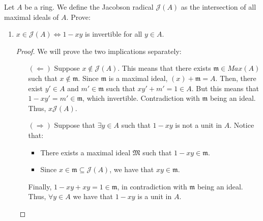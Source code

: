 
\begin{problem}
    Let $A$ be a ring.
    We define the Jacobson radical $\mathcal{J}(A)$ as the intersection of all maximal ideals of $A$.
    Prove:
    \begin{enumerate}[label=(\theproblem.\arabic*),ref=\theproblem.\arabic*]

        \item \label{itm:jacobson_element_to_invertible}
        $x \in \mathcal{J}(A) \Leftrightarrow 1-xy$ is invertible for all $y \in A$.
            \begin{sol}
                \begin{proof}
                We will prove the two implications separately:
                    \begin{itemize}
                        \item[$(\Leftarrow)$]
                        Suppose $x \notin \mathcal{J}(A)$.
                        This means that there exists $\mathfrak{m} \in Max(A)$ such that $x \notin \mathfrak{m}$.
                        Since $\mathfrak{m}$ is a maximal ideal, $(x) + \mathfrak{m} = A$.
                        Then, there exist $y' \in A$ and $m' \in \mathfrak{m}$ such that $x y' + m' = 1 \in A$.
                        But this means that $1 - x y' = m' \in \mathfrak{m}$, which invertible.
                        Contradiction with $\mathfrak{m}$ being an ideal.
                        Thus, $x \mathcal{J}(A)$.
                        \item[$(\Rightarrow)$]
                        Suppose that $\exists y \in A$ such that $1-x y$ is not a unit in $A$.
                        Notice that:
                        \begin{itemize}
                            \item There exists a maximal ideal $\mathfrak{M}$ such that $1 - x y \in \mathfrak{m}$.
                            \item Since $x \in \mathfrak{m} \subseteq \mathcal{J}(A)$, we have that $x y \in \mathfrak{m}$.
                        \end{itemize}
                        Finally,  $1 - x y + x y = 1 \in \mathfrak{m}$, in contradiction with $\mathfrak{m}$ being an ideal.
                        Thus, $\forall y \in A$ we have that $1 - x y$ is a unit in $A$.
                    \end{itemize}
                \end{proof}
            \end{sol}


\end{enumerate}
\end{problem}
